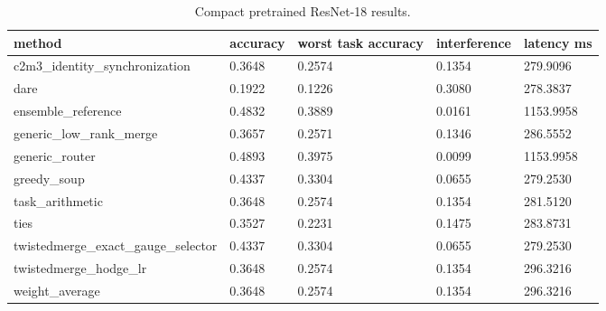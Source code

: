 \begin{table}[t]
\centering
\caption{Compact pretrained ResNet-18 results.}
\begin{tabular}{lllll}
\toprule
method & accuracy & worst task accuracy & interference & latency ms \\
\midrule
c2m3\_identity\_synchronization & 0.3648 & 0.2574 & 0.1354 & 279.9096 \\
dare & 0.1922 & 0.1226 & 0.3080 & 278.3837 \\
ensemble\_reference & 0.4832 & 0.3889 & 0.0161 & 1153.9958 \\
generic\_low\_rank\_merge & 0.3657 & 0.2571 & 0.1346 & 286.5552 \\
generic\_router & 0.4893 & 0.3975 & 0.0099 & 1153.9958 \\
greedy\_soup & 0.4337 & 0.3304 & 0.0655 & 279.2530 \\
task\_arithmetic & 0.3648 & 0.2574 & 0.1354 & 281.5120 \\
ties & 0.3527 & 0.2231 & 0.1475 & 283.8731 \\
twistedmerge\_exact\_gauge\_selector & 0.4337 & 0.3304 & 0.0655 & 279.2530 \\
twistedmerge\_hodge\_lr & 0.3648 & 0.2574 & 0.1354 & 296.3216 \\
weight\_average & 0.3648 & 0.2574 & 0.1354 & 296.3216 \\
\bottomrule
\end{tabular}
\end{table}
